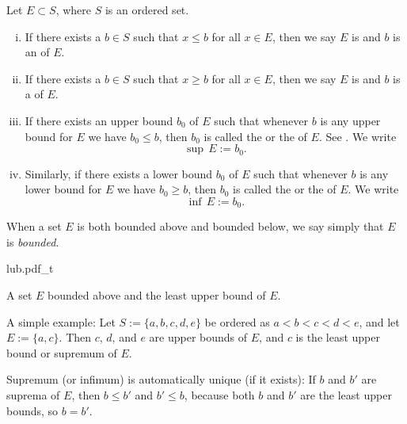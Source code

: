 \begin{defn}
Let $E \subset S$, where $S$ is an ordered set.
\begin{enumerate}[(i)]
\item If there exists a $b \in S$ such that $x \leq b$ for all $x \in E$,
then we say $E$ is \emph{} and $b$
is an \emph{} of $E$.
\item If there exists a $b \in S$ such that $x \geq b$ for all $x \in E$,
then we say $E$ is \emph{} and $b$
is a \emph{} of $E$.
\item If there exists an upper bound $b_0$ of $E$ such that whenever
$b$ is any upper bound for $E$ we have $b_0 \leq b$, then $b_0$
is called the \emph{} or
the \emph{}
of $E$.  See .  We write
\begin{equation*}
\sup\, E := b_0  .
\end{equation*}
\item Similarly, if there exists a lower bound $b_0$ of $E$ such that whenever
$b$ is any lower bound for $E$ we have $b_0 \geq b$, then $b_0$
is called the \emph{} or
the \emph{}
of $E$.  We write
\begin{equation*}
\inf\, E := b_0  .
\end{equation*}
\end{enumerate}
When a set $E$ is both bounded above and bounded below, we say simply that
$E$ is \emph{bounded}.
\end{defn}

\begin{myfigureht}
{lub.pdf_t}
\caption{A set $E$ bounded above and the least upper bound of $E$.\label{fig:lub}}
\end{myfigureht}

A simple example:
Let $S := \{ a, b, c, d, e \}$ be ordered as $a < b < c < d < e$, and
let $E := \{ a, c \}$.  Then $c$, $d$, and $e$ are upper bounds of $E$, and
$c$ is the least upper bound or supremum of $E$.

Supremum (or infimum) is automatically unique (if it exists): If $b$ and
$b'$ are suprema of $E$, then $b \leq b'$ and $b' \leq b$, because both
$b$ and $b'$ are the least upper bounds, so $b=b'$.

